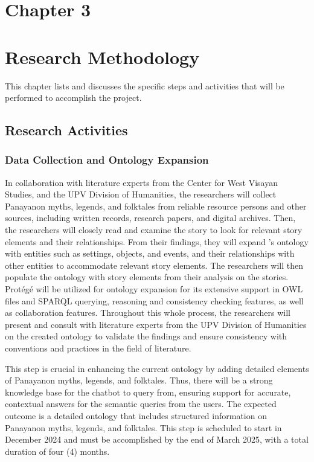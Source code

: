 \section*{Chapter 3}
\section{Research Methodology}
This chapter lists and discusses the specific steps and activities that will be performed  to accomplish the project. 

\subsection{Research Activities}

\subsubsection{Data Collection and Ontology Expansion}
In collaboration with literature experts from the Center for West Visayan Studies, and the UPV Division of Humanities, the researchers will collect Panayanon myths, legends, and folktales from reliable resource persons and other sources, including written records, research papers, and digital archives. Then, the researchers will closely read and examine the story to look for relevant story elements and their relationships. From their findings, they will expand 's ontology with entities such as settings, objects, and events, and their relationships with other entities to accommodate relevant story elements. The researchers will then populate the ontology with story elements from their analysis on the stories.  Protégé will be utilized for ontology expansion for its extensive support in OWL files and SPARQL querying, reasoning and consistency checking features, as well as collaboration features. Throughout this whole process, the researchers will present and consult with literature experts from the UPV Division of Humanities on the created ontology to validate the findings and ensure consistency with conventions and practices in the field of literature. 

This step is crucial in enhancing the current ontology by adding detailed elements of Panayanon myths, legends, and folktales. Thus, there will be a strong knowledge base for the chatbot to query from, ensuring support for accurate, contextual answers for the semantic queries from the users. The expected outcome is a detailed ontology that includes structured information on Panayanon myths, legends, and folktales. This step is scheduled to start in December 2024 and must be accomplished by the end of March 2025, with a total duration of four (4) months.

